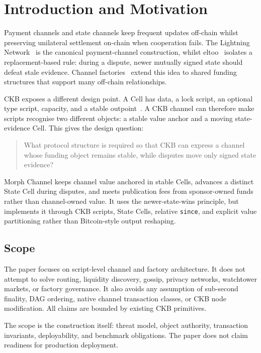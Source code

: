 \documentclass[a4paper,11pt]{article}
\begin{document}
\tableofcontents
\clearpage

\section{Introduction and Motivation}

Payment channels and state channels keep frequent updates off-chain whilst preserving unilateral settlement on-chain when cooperation fails. The Lightning Network~\cite{lightning} is the canonical payment-channel construction, whilst eltoo~\cite{eltoo} isolates a replacement-based rule: during a dispute, newer mutually signed state should defeat stale evidence. Channel factories~\cite{factories} extend this idea to shared funding structures that support many off-chain relationships.

CKB exposes a different design point. A Cell has data, a lock script, an optional type script, capacity, and a stable outpoint~\cite{ckb-cell,ckb-tx}. A CKB channel can therefore make scripts recognise two different objects: a stable value anchor and a moving state-evidence Cell. This gives the design question:

\begin{quote}
What protocol structure is required so that CKB can express a channel whose funding object remains stable, while disputes move only signed state evidence?
\end{quote}

Morph Channel keeps channel value anchored in stable Cells, advances a distinct State Cell during disputes, and meets publication fees from sponsor-owned funds rather than channel-owned value. It uses the newer-state-wins principle, but implements it through CKB scripts, State Cells, relative \texttt{since}, and explicit value partitioning rather than Bitcoin-style output reshaping.

\subsection{Scope}

The paper focuses on script-level channel and factory architecture. It does not attempt to solve routing, liquidity discovery, gossip, privacy networks, watchtower markets, or factory governance. It also avoids any assumption of sub-second finality, DAG ordering, native channel transaction classes, or CKB node modification. All claims are bounded by existing CKB primitives.

The scope is the construction itself: threat model, object authority, transaction invariants, deployability, and benchmark obligations. The paper does not claim readiness for production deployment.
\end{document}

